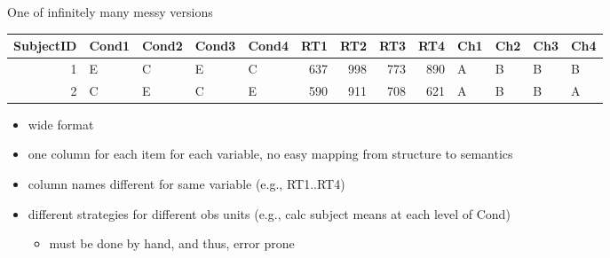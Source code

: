 \documentclass[presentation]{beamer}
\begin{document}
\begin{frame}[label={sec:org4790edd}]{One of infinitely many messy versions}
\begin{tiny}
\begin{center}
\begin{tabular}{rllllrrrrllll}
\hline
SubjectID & Cond1 & Cond2 & Cond3 & Cond4 & RT1 & RT2 & RT3 & RT4 & Ch1 & Ch2 & Ch3 & Ch4\\
\hline
1 & E & C & E & C & 637 & 998 & 773 & 890 & A & B & B & B\\
2 & C & E & C & E & 590 & 911 & 708 & 621 & A & B & B & A\\
\hline
\end{tabular}
\end{center}
\end{tiny}

\begin{itemize}
\item wide format
\item one column for each item for each variable, no easy mapping from
structure to semantics
\item column names different for same variable (e.g., RT1..RT4)
\item different strategies for different obs units (e.g., calc subject means at each level of Cond)
\begin{itemize}
\item must be done by hand, and thus, \alert{error prone}
\end{itemize}
\end{itemize}
\end{frame}
\end{document}
